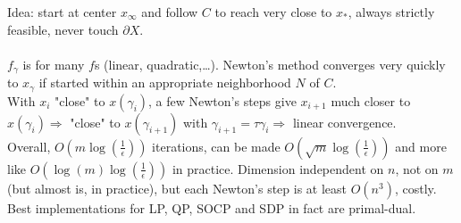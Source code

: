\documentclass[10pt]{report}
\begin{document}
Idea: start at center $x_\infty$ and follow $C$ to reach very close to $x_*$, always strictly feasible, never touch $\partial X$.\\\\
$f_\gamma$ is for many $f$s (linear, quadratic,\ldots). Newton's method converges very quickly to $x_\gamma$ if started within an appropriate neighborhood $N$ of $C$.\\
With $x_i$ "close" to $x(\gamma_i)$, a few Newton's steps give $x_{i+1}$ much closer to $x(\gamma_i) \Rightarrow$ "close" to $x(\gamma_{i+1})$ with $\gamma_{i+1}=\tau\gamma_i \Rightarrow$ linear convergence.\\
Overall, $O(m\log(\frac{1}{\epsilon}))$ iterations, can be made $O(\sqrt{m}\log(\frac{1}{\epsilon}))$ and more like $O(\log(m)\log(\frac{1}{\epsilon}))$ in practice. Dimension independent on $n$, not on $m$ (but almost is, in practice), but each Newton's step is at least $O(n^3)$, costly.\\
Best implementations for LP, QP, SOCP and SDP in fact are primal-dual.
\end{document}
